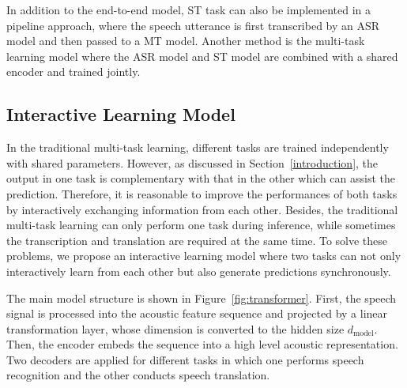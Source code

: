 \documentclass[letterpaper]{article} %
\begin{document}
In addition to the end-to-end model, ST task can also be implemented in a pipeline approach, where the speech utterance is first transcribed by an ASR model and then passed to a MT model. Another method is the multi-task learning model where the ASR model and ST model are combined with a shared encoder and trained jointly.

\subsection{Interactive Learning Model}
In the traditional multi-task learning, different tasks are trained independently with shared parameters. However, as discussed in Section~\ref{introduction}, the output in one task is complementary with that in the other which can assist the prediction. Therefore, it is reasonable to improve the performances of both tasks by interactively exchanging information from each other. Besides, the traditional multi-task learning can only perform one task during inference, while sometimes the transcription and translation are required at the same time. To solve these problems, we propose an interactive learning model where two tasks can not only interactively learn from each other but also generate predictions synchronously.

The main model structure is shown in Figure~\ref{fig:transformer}. First, the speech signal is processed into the acoustic feature sequence and projected by a linear transformation layer, whose dimension is converted to the hidden size $d_{\textrm{model}}$. Then, the encoder embeds the sequence into a high level acoustic representation. Two decoders are applied for different tasks in which one performs speech recognition and the other conducts speech translation.
\end{document}

